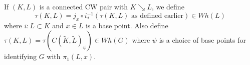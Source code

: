 If $(K, L)$ is a connected CW pair with $K \searrow L$, we define
$$\tau(K, L) = j_x \circ i_*^{-1} (\tau(K, L) \text{ as defined earlier}) \in Wh(L)$$
where $i: L \subset K$ and $x \in L$ is a base point. Also define $\tau(K, L) = \tau(C(\tilde{K}, \tilde{L})_\psi) \in Wh(G)$ where $\psi$ is a choice of base points for identifying $G$ with $\pi_1(L, x)$.
